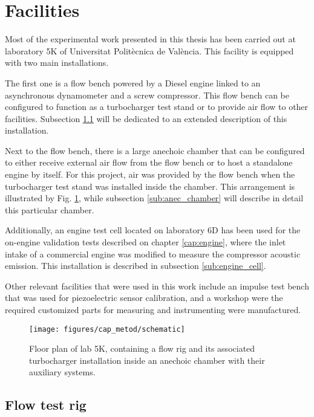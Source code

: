 \section{Facilities}

Most of the experimental work presented in this thesis has been carried out at laboratory 5K of Universitat Politècnica de València. This facility is equipped with two main installations.

The first one is a flow bench powered by a Diesel engine linked to an asynchronous dynamometer and a screw compressor. This flow bench can be configured to function as a turbocharger test stand or to provide air flow to other facilities. Subsection \ref{sub:flow_bench} will be dedicated to an extended description of this installation.

Next to the flow bench, there is a large anechoic chamber that can be configured to either receive external air flow from the flow bench or to host a standalone engine by itself. For this project, air was provided by the flow bench when the turbocharger test stand was installed inside the chamber. This arrangement is illustrated by Fig. \ref{fig:floorplan}, while subsection \ref{sub:anec_chamber} will describe in detail this particular chamber.

Additionally, an engine test cell located on laboratory 6D has been used for the on-engine validation tests described on chapter \ref{cap:engine}, where the inlet intake of a commercial engine was modified to measure the compressor acoustic emission. This installation is described in subsection \ref{sub:engine_cell}.

Other relevant facilities that were used in this work include an impulse test bench that was used for piezoelectric sensor calibration, and a workshop were the required customized parts for measuring and instrumenting were manufactured.

\begin{figure}[t!]
\centering
\texttt{[image: figures/cap\_metod/schematic]}
\caption[Floor plan of laboratory 5K]{Floor plan of lab 5K, containing a flow rig and its associated turbocharger installation inside an anechoic chamber with their auxiliary systems.}
\label{fig:floorplan}
\end{figure}

\subsection{Flow test rig} \label{sub:flow_bench}

